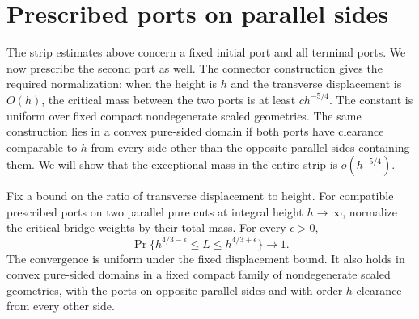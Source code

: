 \section{Prescribed ports on parallel sides}\label{c:parallel-section}

The strip estimates above concern a fixed initial port and all terminal
ports.  We now prescribe the second port as well.  The connector
construction gives the required normalization: when the height is $h$
and the transverse displacement is $O(h)$, the critical mass between the
two ports is at least $ch^{-5/4}$.  The constant is uniform over fixed
compact nondegenerate scaled geometries.  The same construction lies in
a convex pure-sided domain if both ports have clearance comparable to
$h$ from every side other than the opposite parallel sides containing
them.  We will show that the exceptional mass in the entire strip is
$o(h^{-5/4})$.

\begin{theorem}\label{c:parallel}
Fix a bound on the ratio of transverse displacement to height.  For
compatible prescribed ports on two parallel pure cuts at integral height
$h\to\infty$, normalize the critical bridge weights by their total
mass.  For every $\epsilon>0$,
\[
 \Pr\{h^{4/3-\epsilon}\le L
                       \le h^{4/3+\epsilon}\}\longrightarrow1.
\]
The convergence is uniform under the fixed displacement bound.  It also
holds in convex pure-sided domains in a fixed compact family of
nondegenerate scaled geometries, with the ports on opposite parallel
sides and with order-$h$ clearance from every other side.
\end{theorem}

